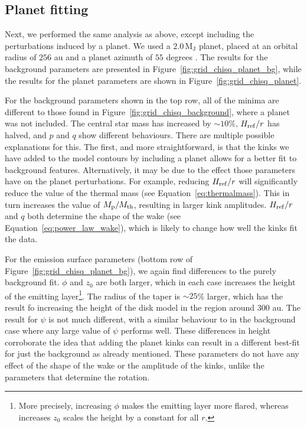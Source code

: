 \subsection{Planet fitting}

Next, we performed the same analysis as above, except including the perturbations induced by a planet.
We used a $2.0 \, \mathrm{M_J}$ planet, placed at an orbital radius of $256$ au and a planet azimuth of $55$ degrees \citep{pinte2018a,calcino2022}.
The results for the background parameters are presented in Figure~\ref{fig:grid_chisq_planet_bg}, while the results for the planet parameters are shown in Figure~\ref{fig:grid_chisq_planet}.

For the background parameters shown in the top row, all of the minima are different to those found in Figure~\ref{fig:grid_chisq_background}, where a planet was not included. The central star mass has increased by $\sim10$\%, $H_{\rm ref}/r$ has halved, and $p$ and $q$ show different behaviours.
There are multiple possible explanations for this.
The first, and more straightforward, is that the kinks we have added to the model contours by including a planet allows for a better fit to background features.
Alternatively, it may be due to the effect those parameters have on the planet perturbations.
For example, reducing $H_{\rm ref}/r$ will significantly reduce the value of the thermal mass (see Equation~\ref{eq:thermalmass}).
This in turn increases the value of $M_{\rm p} / M_{\rm th}$, resulting in larger kink amplitudes.
$H_{\rm ref}/r$ and $q$ both determine the shape of the wake (see Equation~\ref{eq:power_law_wake}), which is likely to change how well the kinks fit the data.

For the emission surface parameters (bottom row of Figure~\ref{fig:grid_chisq_planet_bg}), we again find differences to the purely background fit.
$\phi$ and $z_0$ are both larger, which in each case increases the height of the emitting layer\footnote{More precisely, increasing $\phi$ makes the emitting layer more flared, whereas increases $z_0$ scales the height by a constant for all $r$.}.
The radius of the taper is $\sim 25$\% larger, which has the result fo increasing the height of the disk model in the region around $300$ au.
The result for $\psi$ is not much different, with a similar behaviour to in the background case where any large value of $\psi$ performs well.
These differences in height corroborate the idea that adding the planet kinks can result in a different best-fit for just the background as already mentioned.
These parameters do not have any effect of the shape of the wake or the amplitude of the kinks, unlike the parameters that determine the rotation.

